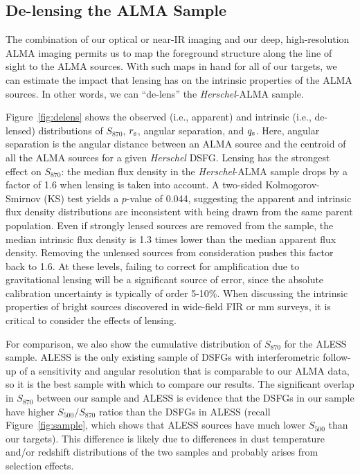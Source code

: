 \documentclass[iop]{emulateapj}
\begin{document}
\subsection{De-lensing the ALMA Sample}\label{sec:lensing}

The combination of our optical or near-IR imaging and our deep, high-resolution
ALMA imaging permits us to map the foreground structure along the line of sight
to the ALMA sources.  With such maps in hand for all of our targets, we can
estimate the impact that lensing has on the intrinsic properties of the ALMA
sources.  In other words, we can ``de-lens'' the {\it Herschel}-ALMA sample.

Figure~\ref{fig:delens} shows the observed (i.e., apparent) and intrinsic
(i.e., de-lensed) distributions of $S_{870}$, $r_{\rm s}$, angular separation,
and $q_{\rm s}$.  Here, angular separation is the angular distance between an
ALMA source and the centroid of all the ALMA sources for a given {\it Herschel}
DSFG.  Lensing has the strongest effect on $S_{870}$: the median flux density
in the {\it Herschel}-ALMA sample drops by a factor of 1.6 when lensing is
taken into account. A two-sided Kolmogorov-Smirnov (KS) test yields a $p$-value
of 0.044, suggesting the apparent and intrinsic flux density distributions are
inconsistent with being drawn from the same parent population.  Even if
strongly lensed sources are removed from the sample, the median intrinsic flux
density is 1.3 times lower than the median apparent flux density.  Removing the
unlensed sources from consideration pushes this factor back to 1.6.  At these
levels, failing to correct for amplification due to gravitational lensing will
be a significant source of error, since the absolute calibration uncertainty is
typically of order 5-10\%.  When discussing the intrinsic properties of bright
sources \citep[including their number counts, e.g.][]{Wyithe:2011rm}
discovered in wide-field FIR or mm surveys, it is critical to consider the
effects of lensing.

For comparison, we also show the cumulative distribution of $S_{870}$ for the
ALESS sample.  ALESS is the only existing sample of DSFGs with interferometric
follow-up of a sensitivity and angular resolution that is comparable to our
ALMA data, so it is the best sample with which to compare our results.  The
significant overlap in $S_{870}$ between our sample and ALESS is evidence that
the DSFGs in our sample have higher $S_{500}/S_{870}$ ratios than the DSFGs in
ALESS (recall Figure~\ref{fig:sample}, which shows that ALESS sources have much
lower $S_{500}$ than our targets).  This difference is likely due to
differences in dust temperature and/or redshift distributions of the two
samples and probably arises from selection effects.
\end{document}

